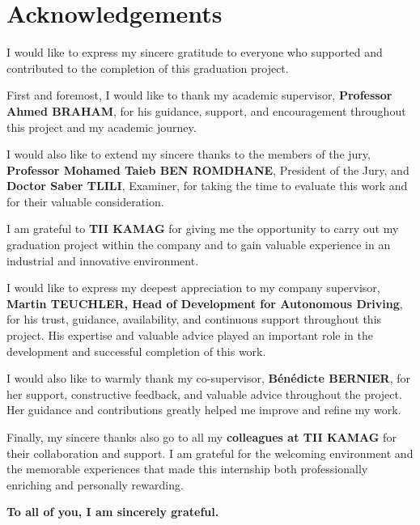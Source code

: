 \documentclass[12pt,a4paper]{report}
\begin{document}
\chapter*{Acknowledgements}
\thispagestyle{empty}
\vspace*{0.3cm}
\begin{center}
\small\itshape   %
\setlength{\parskip}{1.2em} %
\setlength{\parindent}{0pt} %

I would like to express my sincere gratitude to everyone who supported and contributed to the completion of this graduation project.

First and foremost, I would like to thank my academic supervisor, \textbf{Professor Ahmed BRAHAM}, for his guidance, support, and encouragement throughout this project and my academic journey.

I would also like to extend my sincere thanks to the members of the jury, \textbf{Professor Mohamed Taieb BEN ROMDHANE}, President of the Jury, and \textbf{Doctor Saber TLILI}, Examiner, for taking the time to evaluate this work and for their valuable consideration.

I am grateful to \textbf{TII KAMAG} for giving me the opportunity to carry out my graduation project within the company and to gain valuable experience in an industrial and innovative environment.

I would like to express my deepest appreciation to my company supervisor, \textbf{Martin TEUCHLER, Head of Development for Autonomous Driving}, for his trust, guidance, availability, and continuous support throughout this project. His expertise and valuable advice played an important role in the development and successful completion of this work.

I would also like to warmly thank my co-supervisor, \textbf{Bénédicte BERNIER}, for her support, constructive feedback, and valuable advice throughout the project. Her guidance and contributions greatly helped me improve and refine my work.

Finally, my sincere thanks also go to all my \textbf{colleagues at TII KAMAG} for their collaboration and support. I am grateful for the welcoming environment and the memorable experiences that made this internship both professionally enriching and personally rewarding.

\textbf{To all of you, I am sincerely grateful.}
\end{center}
\end{document}
